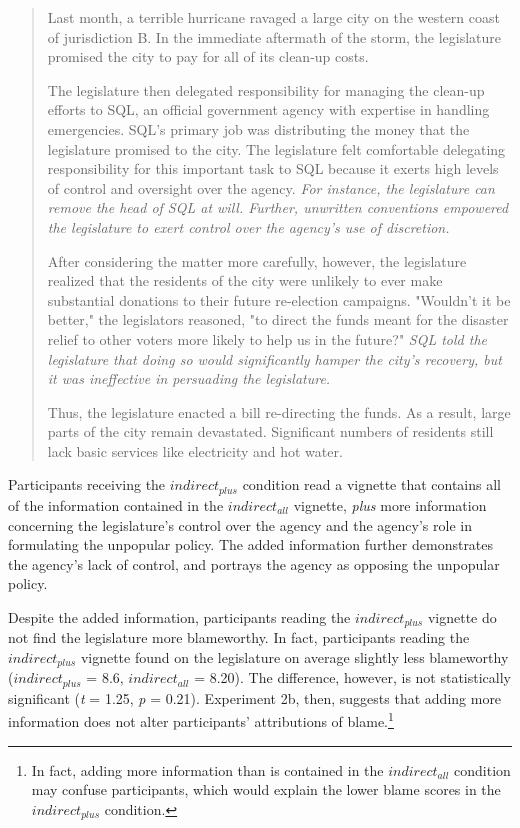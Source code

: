 \documentclass{article}
\begin{document}
\begin{quote}

Last month, a terrible hurricane ravaged a large city on the western coast of jurisdiction B. In the immediate aftermath of the storm, the legislature promised the city to pay for all of its clean-up costs.
 
The legislature then delegated responsibility for managing the clean-up efforts to SQL, an official government agency with expertise in handling emergencies. SQL's primary job was distributing the money that the legislature promised to the city.  The legislature felt comfortable delegating responsibility for this important task to SQL because it exerts high levels of control and oversight over the agency. \emph{For instance, the legislature can remove the head of SQL at will. Further, unwritten conventions empowered the legislature to exert control over the agency's use of discretion.} 

After considering the matter more carefully, however, the legislature realized that the residents of the city were unlikely to ever make substantial donations to their future re-election campaigns. "Wouldn't it be better," the legislators reasoned, "to direct the funds meant for the disaster relief to other voters more likely to help us in the future?" \emph{SQL told the legislature that doing so would significantly hamper the city's recovery, but it was ineffective in persuading the legislature.} 
 
Thus, the legislature enacted a bill re-directing the funds. As a result, large parts of the city remain devastated. Significant numbers of residents still lack basic services like electricity and hot water.

\end{quote}

Participants receiving the $indirect_{plus}$ condition read a vignette that contains all of the information contained in the $indirect_{all}$ vignette, \emph{plus} more information concerning the legislature's control over the agency and the agency's role in formulating the unpopular policy. The added information further demonstrates the agency's lack of control, and portrays the agency as opposing the unpopular policy.

Despite the added information, participants reading the $indirect_{plus}$ vignette do not find the legislature more blameworthy. In fact, participants reading the $indirect_{plus}$ vignette found on the legislature on average slightly less blameworthy ($indirect_{plus}$ = 8.6, $indirect_{all}$ = 8.20). The difference, however, is not statistically significant (\emph{t} = 1.25, \emph{p} = 0.21). Experiment 2b, then, suggests that adding more information does not alter participants' attributions of blame.\footnote{In fact, adding more information than is contained in the $indirect_{all}$ condition may confuse participants, which would explain the lower blame scores in the $indirect_{plus}$ condition.}
\end{document}
